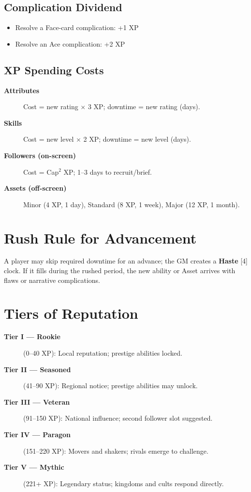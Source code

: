 \subsection{Complication Dividend}
\label{subsec:complication-dividend}
\begin{itemize}
\item Resolve a Face-card complication: +1 XP
\item Resolve an Ace complication: +2 XP
\end{itemize}

\subsection{XP Spending Costs}
\label{subsec:xp-spending}
\begin{description}
\item[\textbf{Attributes}] Cost = new rating $\times$ 3 XP; downtime = new rating (days). 
\item[\textbf{Skills}] Cost = new level $\times$ 2 XP; downtime = new level (days). 
\item[\textbf{Followers (on-screen)}] Cost = Cap$^{2}$ XP; 1–3 days to recruit/brief. 
\item[\textbf{Assets (off-screen)}] Minor (4 XP, 1 day), Standard (8 XP, 1 week), Major (12 XP, 1 month). 
\end{description}

\section{Rush Rule for Advancement}
\label{sec:rush-rule}
A player may skip required downtime for an advance; the GM creates a \textbf{Haste} [4] clock. If it fills during the rushed period, the new ability or Asset arrives with flaws or narrative complications.

\section{Tiers of Reputation}
\label{sec:reputation-tiers}

\begin{description}
\item[\textbf{Tier I — Rookie}] (0–40 XP): Local reputation; prestige abilities locked. 
\item[\textbf{Tier II — Seasoned}] (41–90 XP): Regional notice; prestige abilities may unlock. 
\item[\textbf{Tier III — Veteran}] (91–150 XP): National influence; second follower slot suggested. 
\item[\textbf{Tier IV — Paragon}] (151–220 XP): Movers and shakers; rivals emerge to challenge. 
\item[\textbf{Tier V — Mythic}] (221+ XP): Legendary status; kingdoms and cults respond directly. 
\end{description}

